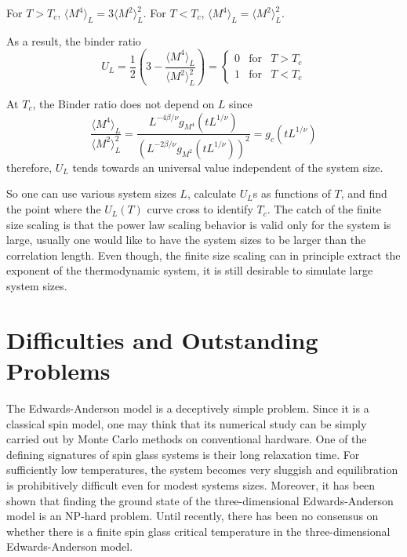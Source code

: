 For $T>T_c$, $\langle M^4\rangle_L = 3 \langle M^2\rangle_L^2$. 
For $T<T_c$, $\langle M^4\rangle_L = \langle M^2\rangle_L^2$.

As a result, the binder ratio
\begin{equation}
  \label{eq:16}
  U_L=\frac{1}{2}\left(3-\frac{\langle M^4\rangle_L}{\langle M^2\rangle^2_L}\right)
  =\left\{
    \begin{array}{ccc}
      0 & \mathrm{for} & T>T_c\\
      1 & \mathrm{for} & T<T_c
    \end{array}
  \right.
\end{equation}

At $T_c$, the Binder ratio does not depend on $L$ since
\begin{equation}
  \label{eq:15}
  \frac{\langle M^4\rangle_L}{\langle M^2\rangle^2_L}
  =\frac{L^{-4\beta/\nu}g_{M^4}(tL^{1/\nu})}{\left(L^{-2\beta/\nu}g_{M^2}(tL^{1/\nu})\right)^2}
  =g_c(tL^{1/\nu})
\end{equation}
therefore, $U_L$ tends towards an universal value independent of the system size.

So one can use various system sizes $L$, calculate $U_L$s as functions of $T$,
and find the point where the $U_L(T)$ curve cross to identify $T_c$. The catch
of the finite size scaling is that the power law scaling behavior is valid
only for the system is large, usually one would like to have the system
sizes to be larger than the correlation length. Even though, the finite size
scaling can in principle extract the exponent of the thermodynamic system,
it is still desirable to simulate large system sizes.
  
\section{Difficulties and Outstanding Problems}
The Edwards-Anderson model is a deceptively simple problem. Since it is a classical spin 
model, one may think that its numerical study can be simply carried out by Monte
Carlo methods on conventional hardware. One of the defining signatures of spin glass 
systems is their long relaxation time. 
For sufficiently low temperatures, the system becomes very sluggish and 
equilibration is prohibitively difficult even for modest systems sizes. 
Moreover, it has been shown that finding the ground state of the three-dimensional
Edwards-Anderson model is an NP-hard problem. \cite{Barahona-1982} 
Until recently, there has been no consensus on whether there is a finite spin 
glass critical temperature in the three-dimensional Edwards-Anderson model.

